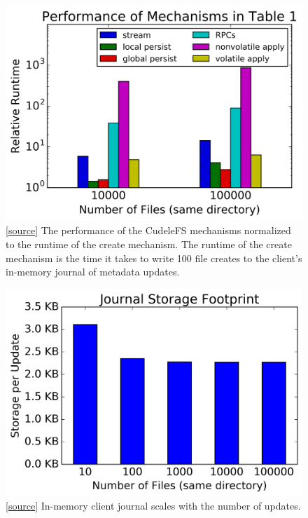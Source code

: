 \begin{figure}[tb]
\centering
\includegraphics[width=1.0\linewidth]{graphs/slowdown-mechanisms.png}
\caption{
[\href{https://github.com/michaelsevilla/cudele-popper/blob/master/viz-decoupled.ipynb}{source}]
The performance of the CudeleFS mechanisms normalized to the runtime of the
create mechanism. The runtime of the create mechanism is the time it takes to
write 100 file creates to the client's in-memory journal of metadata
updates.\label{fig:slowdown-mechanisms}}
\end{figure}

\begin{figure}[tb]
\centering
\includegraphics[width=1.0\linewidth]{graphs/behavior-journal-size.png}
\caption{
[\href{https://github.com/michaelsevilla/cudele-popper/blob/master/viz-decoupled.ipynb}{source}]
In-memory client journal scales with the number of
updates.\label{fig:behavior-journal-size}}
\end{figure}

